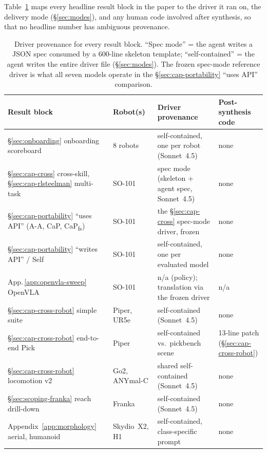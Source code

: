 Table~\ref{tab:provenance} maps every headline result block in the paper
to the driver it ran on, the delivery mode (\S\ref{sec:modes}),
and any human code involved after synthesis, so that no headline
number has ambiguous provenance.

\begin{table}[t]
\centering
\footnotesize
\setlength{\tabcolsep}{3pt}
\begin{tabular}{llll}
\toprule
\textbf{Result block} & \textbf{Robot(s)} & \textbf{Driver provenance} & \textbf{Post-synthesis code} \\
\midrule
\S\ref{sec:onboarding} onboarding scoreboard & 8 robots & self-contained, one per robot (Sonnet~4.5) & none \\
\S\ref{sec:cap-cross} cross-skill, \S\ref{sec:cap-rlsteelman} multi-task & SO-101 & spec mode (skeleton + agent spec, Sonnet~4.5) & none \\
\S\ref{sec:cap-portability} ``uses API'' (A-A, CaP, CaP\textsubscript{fs}) & SO-101 & the \S\ref{sec:cap-cross} spec-mode driver, frozen & none \\
\S\ref{sec:cap-portability} ``writes API'' / Self & SO-101 & self-contained, one per evaluated model & none \\
App.\,\ref{app:openvla-sweep} OpenVLA & SO-101 & n/a (policy); translation via the frozen driver & n/a \\
\S\ref{sec:cap-cross-robot} simple suite & Piper, UR5e & self-contained (Sonnet~4.5) & none \\
\S\ref{sec:cap-cross-robot} end-to-end Pick & Piper & self-contained vs.\ pickbench scene & 13-line patch (\S\ref{sec:cap-cross-robot}) \\
\S\ref{sec:cap-cross-robot} locomotion v2 & Go2, ANYmal-C & shared self-contained (Sonnet~4.5) & none \\
\S\ref{sec:scoping-franka} reach drill-down & Franka & self-contained (Sonnet~4.5) & none \\
Appendix~\ref{app:morphology} aerial, humanoid & Skydio~X2, H1 & self-contained, class-specific prompt & none \\
\bottomrule
\end{tabular}
\caption{Driver provenance for every result block. ``Spec mode''
= the agent writes a JSON spec consumed by a 600-line skeleton
template; ``self-contained'' = the agent writes the entire driver
file (\S\ref{sec:modes}). The frozen spec-mode reference driver
is what all seven models operate in the
\S\ref{sec:cap-portability} ``uses API'' comparison.}
\label{tab:provenance}
\end{table}


